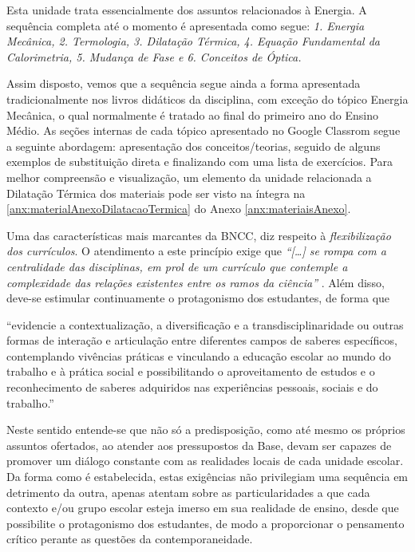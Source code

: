 Esta unidade trata essencialmente dos assuntos relacionados à Energia. A sequência completa até o momento é apresentada como segue: \emph{1. Energia Mecânica, 2. Termologia, 3. Dilatação Térmica, 4. Equação Fundamental da Calorimetria, 5. Mudança de Fase e 6. Conceitos de Óptica.}

Assim disposto, vemos que a sequência segue ainda a forma apresentada tradicionalmente nos livros didáticos da disciplina, com exceção do tópico Energia Mecânica, o qual normalmente é tratado ao final do primeiro ano do Ensino Médio. As seções internas de cada tópico apresentado no Google Classrom segue a seguinte abordagem: apresentação dos conceitos/teorias, seguido de alguns exemplos de substituição direta e finalizando com uma lista de exercícios. Para melhor compreensão e visualização, um elemento da unidade relacionada a Dilatação Térmica dos materiais pode ser visto na íntegra na \autoref{anx:materialAnexoDilatacaoTermica} do Anexo \ref{anx:materiaisAnexo}.  

Uma das características mais marcantes da \ac{BNCC}, diz respeito à \emph{flexibilização dos currículos}. O atendimento a este princípio exige que \emph{``[\ldots] se rompa com a centralidade das disciplinas, em prol de um currículo que contemple a complexidade das relações existentes entre os ramos da ciência''} \cite{BRASIL:2017}. Além disso, deve-se estimular continuamente o protagonismo dos estudantes, de forma que

\begin{citacao}
    ``evidencie a contextualização, a diversificação e a transdisciplinaridade ou outras formas de interação e articulação entre diferentes campos de saberes específicos, contemplando vivências práticas e vinculando a educação escolar ao mundo do trabalho e à prática social e possibilitando o aproveitamento de estudos e o reconhecimento de saberes adquiridos nas experiências pessoais, sociais e do trabalho.'' \cite{BRASIL:2018}
\end{citacao}
Neste sentido entende-se que não só a predisposição, como até mesmo os próprios assuntos ofertados, ao atender aos pressupostos da Base, devam ser capazes de promover um diálogo constante com as realidades locais de cada unidade escolar. Da forma como é estabelecida, estas exigências não privilegiam uma sequência em detrimento da outra, apenas atentam sobre as particularidades a que cada contexto e/ou grupo escolar esteja imerso em sua realidade de ensino, desde que possibilite o protagonismo dos estudantes, de modo a proporcionar o pensamento crítico perante as questões da contemporaneidade.

